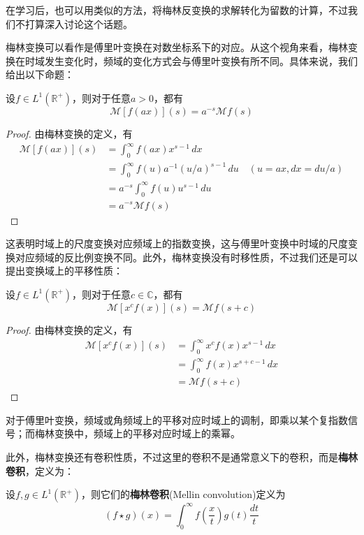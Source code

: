 在学习后，也可以用类似的方法，将梅林反变换的求解转化为留数的计算，不过我们不打算深入讨论这个话题。

梅林变换可以看作是傅里叶变换在对数坐标系下的对应。从这个视角来看，梅林变换在时域发生变化时，频域的变化方式会与傅里叶变换有所不同。具体来说，我们给出以下命题：
\begin{proposition}[梅林变换的尺度变换性质]
    设$f\in L^1(\mathbb{R}^+)$，则对于任意$a>0$，都有
    \[\mathcal{M} [f(ax)](s)=a^{-s}\mathcal{M} f(s)\]
\end{proposition}
\begin{proof}
    由梅林变换的定义，有
    \begin{align*}
        \mathcal{M} [f(ax)](s)&=\int_0^{\infty}f(ax)x^{s-1}\,dx\\
        &=\int_0^{\infty}f(u)a^{-1}(u/a)^{s-1}\,du\quad (u=ax,dx=du/a)\\
        &=a^{-s}\int_0^{\infty}f(u)u^{s-1}\,du\\
        &=a^{-s}\mathcal{M} f(s)
    \end{align*}
\end{proof}

这表明时域上的尺度变换对应频域上的指数变换，这与傅里叶变换中时域的尺度变换对应频域的反比例变换不同。此外，梅林变换没有时移性质，不过我们还是可以提出变换域上的平移性质：

\begin{proposition}[梅林变换的乘幂性质]
    设$f\in L^1(\mathbb{R}^+)$，则对于任意$c\in\mathbb{C}$，都有
    \[\mathcal{M} [x^c f(x)](s)=\mathcal{M} f(s+c)\]
\end{proposition}
\begin{proof}
    由梅林变换的定义，有
    \begin{align*}
        \mathcal{M} [x^c f(x)](s)&=\int_0^{\infty}x^c f(x)x^{s-1}\,dx\\
        &=\int_0^{\infty}f(x)x^{s+c-1}\,dx\\
        &=\mathcal{M} f(s+c)
    \end{align*}
\end{proof}

对于傅里叶变换，频域或角频域上的平移对应时域上的调制，即乘以某个复指数信号；而梅林变换中，频域上的平移对应时域上的乘幂。

此外，梅林变换还有卷积性质，不过这里的卷积不是通常意义下的卷积，而是\textbf{梅林卷积}，定义为：
\begin{definition}[梅林卷积]
    设$f,g\in L^1(\mathbb{R}^+)$，则它们的\textbf{梅林卷积}(Mellin convolution)定义为
    \[(f\star g)(x)=\int_0^{\infty}f\left(\frac{x}{t}\right)g(t)\frac{dt}{t}\]
\end{definition}

